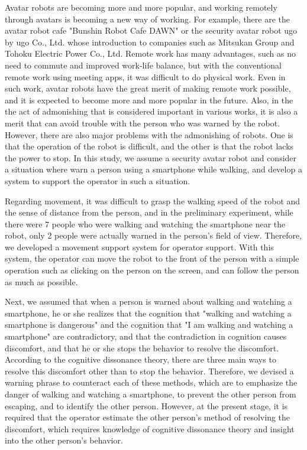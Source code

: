 \documentclass{kuisthesis}
\begin{document}
\begin{eabstract}
Avatar robots are becoming more and more popular, and working remotely through avatars is becoming a new way of working.
For example, there are the avatar robot cafe "Bunshin Robot Cafe DAWN" or the security avatar robot ugo by ugo Co., Ltd. whose introduction to companies such as Mitsukan Group and Tohoku Electric Power Co., Ltd.
Remote work has many advantages, such as no need to commute and improved work-life balance, but with the conventional remote work using meeting apps, it was difficult to do physical work.
Even in such work, avatar robots have the great merit of making remote work possible, and it is expected to become more and more popular in the future. 
Also, in the the act of admonishing that is considered important in various works, it is also a merit that can avoid trouble with the person who was warned by the robot.
However, there are also major problems with the admonishing of robots.
One is that the operation of the robot is difficult, and the other is that the robot lacks the power to stop.
In this study, we assume a security avatar robot and consider a situation where warn a person using a smartphone while walking, 
and develop a system to support the operator in such a situation.

Regarding movement, it was difficult to grasp the walking speed of the robot and the sense of distance from the person, and in the preliminary experiment, while there were 7 people who were walking and watching the smartphone near the robot, only 2 people were actually warned in the person's field of view.
Therefore, we developed a movement support system for operator support. With this system, the operator can move the robot to the front of the person with a simple operation such as clicking on the person on the screen, and can follow the person as much as possible.

Next, we assumed that when a person is warned about walking and watching a smartphone, he or she realizes that the cognition that "walking and watching a smartphone is dangerous" and the cognition that "I am walking and watching a smartphone" are contradictory, and that the contradiction in cognition causes discomfort, and that he or she stops the behavior to resolve the discomfort. According to the cognitive dissonance theory, there are three main ways to resolve this discomfort other than to stop the behavior. Therefore, we devised a warning phrase to counteract each of these methods, which are to emphasize the danger of walking and watching a smartphone, to prevent the other person from escaping, and to identify the other person. However, at the present stage, it is required that the operator estimate the other person's method of resolving the discomfort, which requires knowledge of cognitive dissonance theory and insight into the other person's behavior.


\end{eabstract}
\end{document}
